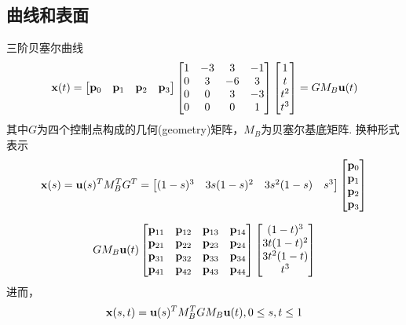 \subsection{曲线和表面}
\begin{definition}
三阶贝塞尔曲线
\[\mathbf{x}(t)=\begin{bmatrix}\mathbf{p}_0&\mathbf{p}_1&\mathbf{p}_2&\mathbf{p}_3\end{bmatrix}\begin{bmatrix}1&-3&3&-1\\0&3&-6&3\\0&0&3&-3\\0&0&0&1\end{bmatrix}\begin{bmatrix}1\\t\\t^2\\t^3\end{bmatrix}=GM_B\mathbf{u}(t)\]
\rm 其中$G$为四个控制点构成的几何(geometry)矩阵，$M_B$为贝塞尔基底矩阵. 换种形式表示
\[\mathbf{x}(s)=\mathbf{u}(s)^TM_B^TG^T=\begin{bmatrix}(1-s)^3&3s(1-s)^2&3s^2(1-s)&s^3\end{bmatrix}\begin{bmatrix}\mathbf{p}_0\\\mathbf{p}_1\\\mathbf{p}_2\\\mathbf{p}_3\end{bmatrix}\]
\end{definition}
\begin{definition}[贝塞尔表面]
\[GM_B\mathbf{u}(t)\begin{bmatrix}\mathbf{p}_{11}&\mathbf{p}_{12}&\mathbf{p}_{13}&\mathbf{p}_{14}\\\mathbf{p}_{21}&\mathbf{p}_{22}&\mathbf{p}_{23}&\mathbf{p}_{24}\\\mathbf{p}_{31}&\mathbf{p}_{32}&\mathbf{p}_{33}&\mathbf{p}_{34}\\\mathbf{p}_{41}&\mathbf{p}_{42}&\mathbf{p}_{43}&\mathbf{p}_{44}\end{bmatrix}\begin{bmatrix}(1-t)^3\\3t(1-t)^2\\3t^2(1-t)\\t^3\end{bmatrix}\]
进而，
\[\mathbf{x}(s,t)=\mathbf{u}(s)^TM_B^TGM_B\mathbf{u}(t),0\leq s,t\leq 1\]
\end{definition}